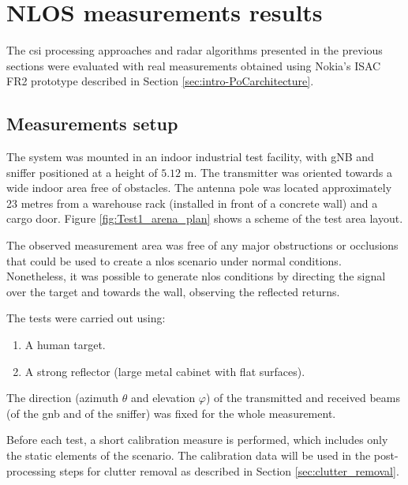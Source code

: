 \chapter{NLOS measurements results}

The \gls{csi} processing approaches and radar algorithms presented in the previous sections were evaluated with real measurements obtained using Nokia's ISAC FR2 prototype described in Section \ref{sec:intro-PoCarchitecture}.

\section{Measurements setup}
\label{sec:Test1_meas_scenario}

The system was mounted in an indoor industrial test facility, with gNB and sniffer positioned at a height of $5.12$ m. The transmitter was oriented towards a wide  indoor area free of obstacles. The antenna pole was located approximately 23 metres from a warehouse rack (installed in front of a concrete wall) and a cargo door.
Figure \ref{fig:Test1_arena_plan} shows a scheme of the test area layout.

The observed measurement area was free of any major obstructions or occlusions that could be used to create a \gls{nlos} scenario under normal conditions.
Nonetheless, it was possible to generate \gls{nlos} conditions by directing the signal over the target and towards the wall, observing the reflected returns.

 
The tests were carried out using:

\begin{enumerate}
	\item A human target.
	\item A strong reflector (large metal cabinet with flat surfaces).
\end{enumerate}

The direction (azimuth $\theta$ and elevation $\varphi$) of the transmitted and received beams (\ie of the \gls{gnb} and of the sniffer) was fixed for the whole measurement.

Before each test, a short calibration measure is performed, which includes only the static elements of the scenario. The calibration data will be used in the post-processing steps for clutter removal as described in Section \ref{sec:clutter_removal}.

